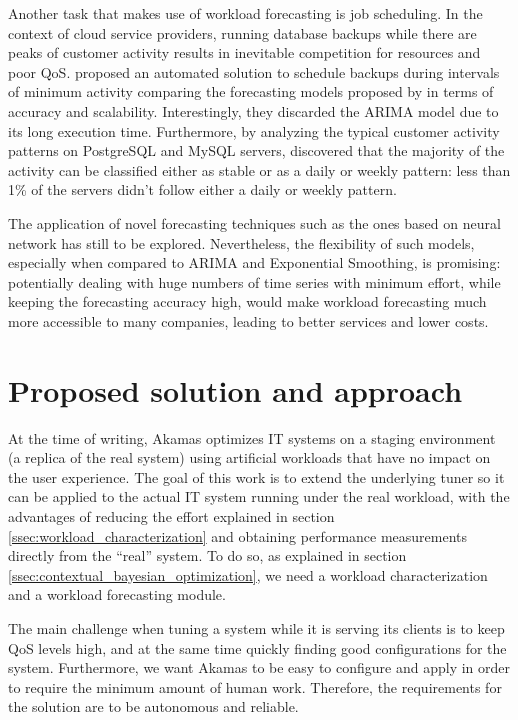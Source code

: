 \documentclass[a4paper]{article} %
\begin{document}
	Another task that makes use of workload forecasting is job scheduling. In the context of cloud service providers, running database backups while there are peaks of customer activity results in inevitable competition for resources and poor QoS. \cite{Seagull} proposed an automated solution to schedule backups during intervals of minimum activity comparing the forecasting models proposed by \cite{MicrosoftSSA, GluonTS, FacebookProphet} in terms of accuracy and scalability. Interestingly, they discarded the ARIMA model due to its long execution time. Furthermore, by analyzing the typical customer activity patterns on PostgreSQL and MySQL servers, \cite{Seagull} discovered that the majority of the activity can be classified either as stable or as a daily or weekly pattern: less than 1\% of the servers didn't follow either a daily or weekly pattern.
	
	The application of novel forecasting techniques such as the ones based on neural network has still to be explored. Nevertheless, the flexibility of such models, especially when compared to ARIMA and Exponential Smoothing, is promising: potentially dealing with huge numbers of time series with minimum effort, while keeping the forecasting accuracy high, would make workload forecasting much more accessible to many companies, leading to better services and lower costs.
	
	\section{ Proposed solution and approach }
	At the time of writing, Akamas \cite{AkamasCGP} optimizes IT systems on a staging environment (a replica of the real system) using artificial workloads that have no impact on the user experience. The goal of this work is to extend the underlying tuner so it can be applied to the actual IT system running under the real workload, with the advantages of reducing the effort explained in section \ref{ssec:workload_characterization} and obtaining performance measurements directly from the ``real'' system. To do so, as explained in section \ref{ssec:contextual_bayesian_optimization}, we need a workload characterization and a workload forecasting module.
	
	The main challenge when tuning a system while it is serving its clients is to keep QoS levels high, and at the same time quickly finding good configurations for the system. Furthermore, we want Akamas to be easy to configure and apply in order to require the minimum amount of human work. Therefore, the requirements for the solution are to be autonomous and reliable.
	
\end{document}
